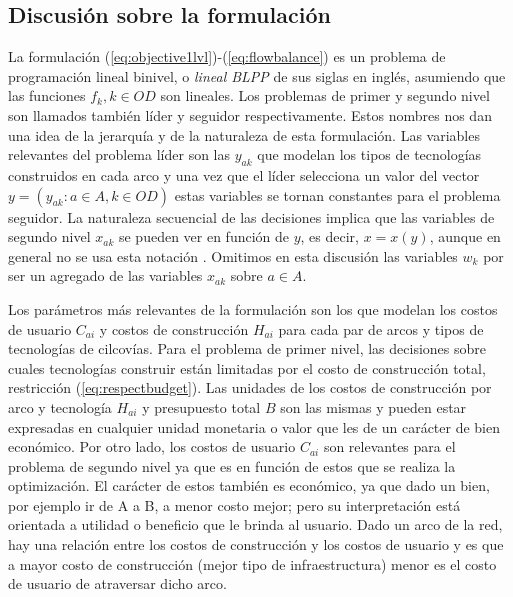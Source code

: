 \documentclass{article}
\begin{document}
  \subsection*{Discusión sobre la formulación}

  La formulación (\ref{eq:objective1lvl})-(\ref{eq:flowbalance}) es un problema de programación lineal binivel, o {\it lineal BLPP} de sus siglas en inglés, asumiendo que las funciones $f_k, k\in OD$ son lineales. Los problemas de primer y segundo nivel son llamados también líder y seguidor respectivamente. Estos nombres nos dan una idea de la jerarquía y de la naturaleza de esta formulación. Las variables relevantes del problema líder son las $y_{ak}$ que modelan los tipos de tecnologías construidos en cada arco y una vez que el líder selecciona un valor del vector $y = \left( y_{ak}: a \in A, k \in OD \right)$ estas variables se tornan constantes para el problema seguidor. La naturaleza secuencial de las decisiones implica que las variables de segundo nivel $x_{ak}$ se pueden ver en función de $y$, es decir, $x = x(y)$, aunque en general no se usa esta notación \cite{bardbook}. Omitimos en esta discusión las variables $w_k$ por ser un agregado de las variables $x_{ak}$ sobre $a \in A$.


  Los parámetros más relevantes de la formulación son los que modelan los costos de usuario $C_{ai}$ y costos de construcción $H_{ai}$ para cada par de arcos y tipos de tecnologías de cilcovías. Para el problema de primer nivel, las decisiones sobre cuales tecnologías construir están limitadas por el costo de construcción total, restricción (\ref{eq:respectbudget}). Las unidades de los costos de construcción por arco y tecnología $H_{ai}$ y presupuesto total $B$ son las mismas y pueden estar expresadas en cualquier unidad monetaria o valor que les de un carácter de bien económico. Por otro lado, los costos de usuario $C_{ai}$ son relevantes para el problema de segundo nivel ya que es en función de estos que se realiza la optimización. El carácter de estos también es económico, ya que dado un bien, por ejemplo ir de A a B, a menor costo mejor; pero su interpretación está orientada a utilidad o beneficio que le brinda al usuario. Dado un arco de la red, hay una relación entre los costos de construcción y los costos de usuario y es que a mayor costo de construcción (mejor tipo de infraestructura) menor es el costo de usuario de atraversar dicho arco.
\end{document}
